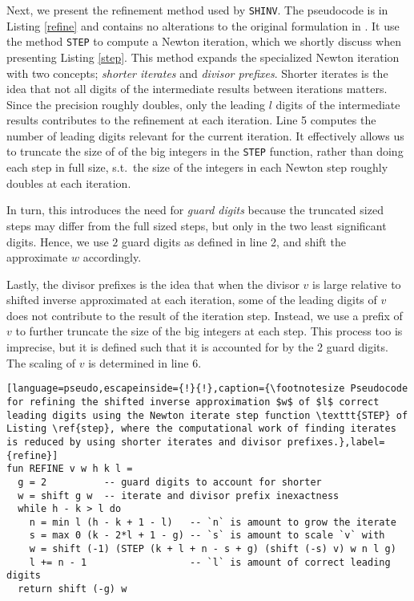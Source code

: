 Next, we present the refinement method used by \texttt{SHINV}. The pseudocode is
in Listing \ref{refine} and contains no alterations to the original formulation
in \cite{watt2023efficient}. It use the method \texttt{STEP} to compute a Newton
iteration, which we shortly discuss when presenting Listing \ref{step}. This
method expands the specialized Newton iteration with two concepts;
\textit{shorter iterates} and \textit{divisor prefixes}. Shorter iterates is the
idea that not all digits of the intermediate results between iterations
matters. Since the precision roughly doubles, only the leading $l$ digits of the
intermediate results contributes to the refinement at each iteration. Line 5
computes the number of leading digits relevant for the current iteration. It
effectively allows us to truncate the size of of the big integers in the
\texttt{STEP} function, rather than doing each step in full size, s.t.\ the size
of the integers in each Newton step roughly doubles at each iteration.

In turn, this introduces the need for \textit{guard digits} because the
truncated sized steps may differ from the full sized steps, but only in the two
least significant digits. Hence, we use $2$ guard digits as defined in line 2,
and shift the approximate $w$ accordingly.

Lastly, the divisor prefixes is the idea that when the divisor $v$ is large
relative to shifted inverse approximated at each iteration, some of the leading
digits of $v$ does not contribute to the result of the iteration step. Instead,
we use a prefix of $v$ to further truncate the size of the big integers at each
step. This process too is imprecise, but it is defined such that it is accounted
for by the 2 guard digits. The scaling of $v$ is determined in line 6.

\begin{lstlisting}[language=pseudo,escapeinside={!}{!},caption={\footnotesize Pseudocode for refining the shifted inverse approximation $w$ of $l$ correct leading digits using the Newton iterate step function \texttt{STEP} of Listing \ref{step}, where the computational work of finding iterates is reduced by using shorter iterates and divisor prefixes.},label={refine}]
fun REFINE v w h k l =
  g = 2          -- guard digits to account for shorter
  w = shift g w  -- iterate and divisor prefix inexactness
  while h - k > l do
    n = min l (h - k + 1 - l)   -- `n` is amount to grow the iterate
    s = max 0 (k - 2*l + 1 - g) -- `s` is amount to scale `v` with
    w = shift (-1) (STEP (k + l + n - s + g) (shift (-s) v) w n l g)
    l += n - 1                  -- `l` is amount of correct leading digits
  return shift (-g) w
\end{lstlisting}

